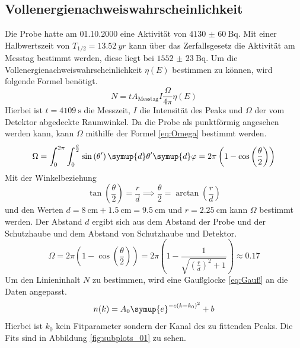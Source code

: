 \subsection{Vollenergienachweiswahrscheinlichkeit}
\label{cap:Vollenergienachweiswahrscheinlichkeit}

Die  Probe hatte am 01.10.2000 eine Aktivität von $\SI{4130(60)}{\becquerel}$. Mit einer 
Halbwertszeit von $T_{1/2} = \SI{13.52}{yr}$ kann über das Zerfallsgesetz die Aktivität 
am Messtag bestimmt werden, diese liegt bei $\SI{1552(23)}{\becquerel}$.
Um die Vollenergienachweiswahrscheinlichkeit $\eta(E)$ bestimmen zu können, wird folgende Formel benötigt.
\begin{equation}
  \label{eq:eta_N}
  N = tA_{\text{Messtag}}I\frac{\Omega}{4\pi}\eta(E)
\end{equation}
Hierbei ist $t=\SI{4109}{\second}$ die Messzeit, $I$ die Intensität  des Peaks und $\Omega$ der vom Detektor abgedeckte
Raumwinkel.
Da die Probe als punktförmig angesehen werden kann, kann $\Omega$ mithilfe der Formel \eqref{eq:Omega} bestimmt werden.
\begin{equation}
  \label{eq:Omega}
  \Omega = \int_{0}^{2\pi}\int_{0}^{\frac{\theta}{2}} \sin\left(\theta'\right)\symup{d}\theta'\symup{d}\varphi = 
  2\pi \left(1-\cos\left(\frac{\theta}{2}\right)\right)
\end{equation}
Mit der Winkelbeziehung 
\begin{equation*}
  \tan\left(\frac{\theta}{2}\right) = \frac{r}{d} \implies \frac{\theta}{2} = \arctan\left(\frac{r}{d}\right)
\end{equation*}
und den Werten $d = \SI{8}{\centi\meter}+\SI{1.5}{\centi\meter}=\SI{9.5}{\centi\meter}$ und $r = \SI{2.25}{\centi\meter}$ kann $\Omega$ bestimmt werden.
Der Abstand $d$ ergibt sich aus dem Abstand der Probe und der Schutzhaube und dem Abstand von Schutzhaube und Detektor.
\begin{equation*}
  \Omega = 2\pi \left(1-\cos\left(\frac{\theta}{2}\right)\right) = 2\pi\left(1- \frac{1}{\sqrt{\left(\frac{r}{d}\right)^2+1}}\right) \approx \num{0.17}
\end{equation*}
Um den Linieninhalt $N$ zu bestimmen, wird eine Gaußglocke \eqref{eq:Gauß} an die Daten angepasst.
\begin{equation}
  \label{eq:Gauß}
  n(k)= A_0 \symup{e}^{-c(k-k_0)^2} + b
\end{equation}
Hierbei ist $k_0$ kein Fitparameter sondern der Kanal des zu fittenden Peaks.
Die Fits sind in Abbildung \ref{fig:subplots_01} zu sehen.
